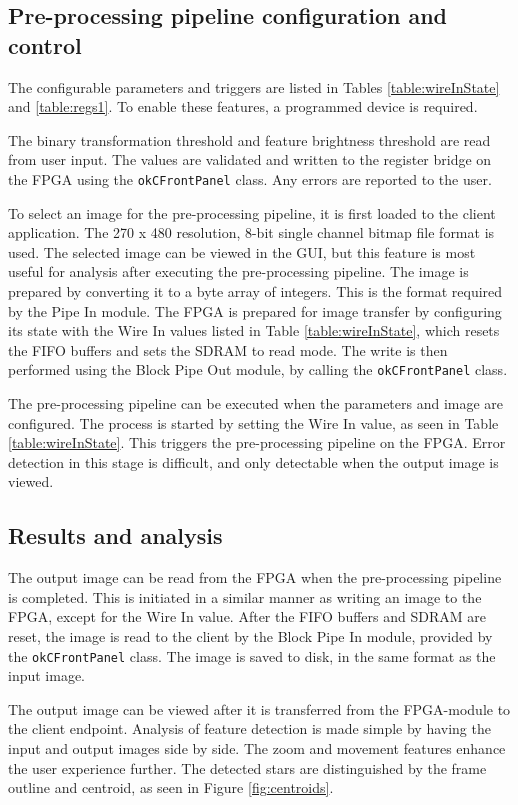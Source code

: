 \documentclass[12pt]{report}
\begin{document}
\subsection{Pre-processing pipeline configuration and control}
The configurable parameters and triggers are listed in Tables \ref*{table:wireInState} and \ref*{table:regs1}. To enable these features, a programmed device is required.
\par
The binary transformation threshold and feature brightness threshold are read from user input. The values are validated and written to the register bridge on the FPGA using the \texttt{okCFrontPanel} class. Any errors are reported to the user.
\par
To select an image for the pre-processing pipeline, it is first loaded to the client application. The 270 x 480 resolution, 8-bit single channel bitmap file format is used. The selected image can be viewed in the GUI, but this feature is most useful for analysis after executing the pre-processing pipeline. The image is prepared by converting it to a byte array of integers. This is the format required by the Pipe In module. The FPGA is prepared for image transfer by configuring its state with the Wire In values listed in Table \ref*{table:wireInState}, which resets the FIFO buffers and sets the SDRAM to read mode.
The write is then performed using the Block Pipe Out module, by calling the \texttt{okCFrontPanel} class.
\par
The pre-processing pipeline can be executed when the parameters and image are configured. The 
process is started by setting the Wire In value, as seen in Table \ref{table:wireInState}. This triggers the pre-processing pipeline on the FPGA. Error detection in this stage is difficult, and only detectable when the output image is viewed.

\subsection{Results and analysis}
The output image can be read from the FPGA when the pre-processing pipeline is completed. This is initiated in a similar manner as writing an image to the FPGA, except for the Wire In value. After the FIFO buffers and SDRAM are reset, the image is read to the client by the Block Pipe In module, provided by the \texttt{okCFrontPanel} class. The image is saved to disk, in the same format as the input image.
\par
The output image can be viewed after it is transferred from the FPGA-module to the client endpoint. Analysis of feature detection is made simple by having the input and output images side by side. The zoom and movement features enhance the user experience further. The detected stars are distinguished by the frame outline and centroid, as seen in Figure \ref*{fig:centroids}. 
\end{document}

